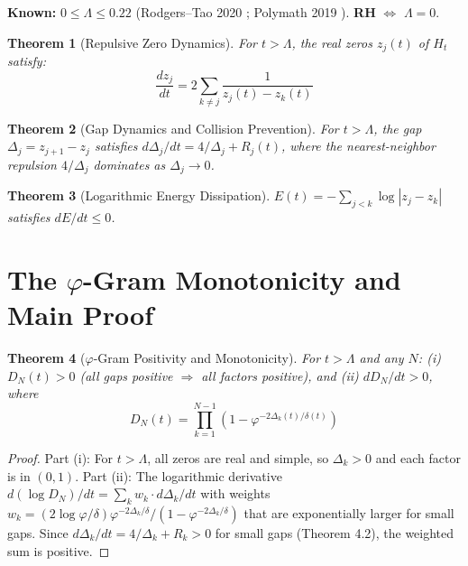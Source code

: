 \documentclass[11pt,a4paper]{article}
\newtheorem{theorem}{Theorem}[section]
\theoremstyle{definition}
\theoremstyle{remark}
\newcommand{\vp}{\varphi}
\begin{document}
\textbf{Known:} $0 \leq \Lambda \leq 0.22$ (Rodgers--Tao 2020 \cite{rodgers2020}; Polymath 2019 \cite{polymath2019}). \textbf{RH} $\iff$ $\Lambda = 0$.

\begin{theorem}[Repulsive Zero Dynamics]
For $t > \Lambda$, the real zeros $z_j(t)$ of $H_t$ satisfy:
\begin{equation}
\frac{dz_j}{dt} = 2\sum_{k \neq j} \frac{1}{z_j(t) - z_k(t)}
\end{equation}
\end{theorem}

\begin{theorem}[Gap Dynamics and Collision Prevention]
For $t > \Lambda$, the gap $\Delta_j = z_{j+1} - z_j$ satisfies $d\Delta_j/dt = 4/\Delta_j + R_j(t)$, where the nearest-neighbor repulsion $4/\Delta_j$ dominates as $\Delta_j \to 0$.
\end{theorem}

\begin{theorem}[Logarithmic Energy Dissipation]
$E(t) = -\sum_{j<k}\log|z_j-z_k|$ satisfies $dE/dt \leq 0$.
\end{theorem}

\section{The $\vp$-Gram Monotonicity and Main Proof}

\begin{theorem}[$\vp$-Gram Positivity and Monotonicity]
For $t > \Lambda$ and any $N$: (i) $D_N(t) > 0$ (all gaps positive $\Rightarrow$ all factors positive), and (ii) $dD_N/dt > 0$, where
\begin{equation}
D_N(t) = \prod_{k=1}^{N-1}(1 - \vp^{-2\Delta_k(t)/\delta(t)})
\end{equation}
\end{theorem}

\begin{proof}
Part (i): For $t > \Lambda$, all zeros are real and simple, so $\Delta_k > 0$ and each factor is in $(0,1)$. Part (ii): The logarithmic derivative $d(\log D_N)/dt = \sum_k w_k \cdot d\Delta_k/dt$ with weights $w_k = (2\log\vp/\delta)\vp^{-2\Delta_k/\delta}/(1 - \vp^{-2\Delta_k/\delta})$ that are exponentially larger for small gaps. Since $d\Delta_k/dt = 4/\Delta_k + R_k > 0$ for small gaps (Theorem 4.2), the weighted sum is positive.
\end{proof}
\end{document}

